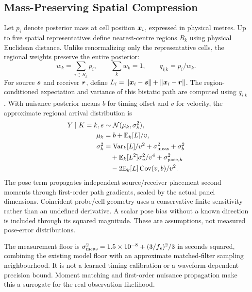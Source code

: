 \subsection{Mass-Preserving Spatial Compression}
Let $p_i$ denote posterior mass at cell position $\boldsymbol{x}_i$, expressed in
physical metres. Up to five spatial representatives define nearest-centre
regions $R_k$ using physical Euclidean distance. Unlike renormalizing only the
representative cells, the regional weights preserve the entire posterior:
\begin{equation}
 w_k=\sum_{i\in R_k}p_i,\qquad
 \sum_k w_k=1,\qquad q_{i|k}=p_i/w_k.
\end{equation}
For source $\boldsymbol{s}$ and receiver $\boldsymbol{r}$, define
$L_i=\|\boldsymbol{x}_i-\boldsymbol{s}\|+\|\boldsymbol{x}_i-\boldsymbol{r}\|$.
The region-conditioned expectation and variance of this bistatic path are
computed using $q_{i|k}$. With nuisance posterior means $b$ for timing offset and
$v$ for velocity, the approximate regional arrival distribution is
\begin{align}
Y\mid K=k,e &\sim \mathcal{N}(\mu_k,\sigma_k^2),\\
\mu_k &=b+\mathbb{E}_k[L]/v,\\
\sigma_k^2 &=\operatorname{Var}_k[L]/v^2+\sigma_{\rm meas}^2+\sigma_b^2\nonumber\\
 &\quad+\mathbb{E}_k[L^2]\sigma_v^2/v^4+\sigma_{{\rm pose},k}^2\nonumber\\
 &\quad-2\mathbb{E}_k[L]\operatorname{Cov}(v,b)/v^2.
\end{align}
The pose term propagates independent source/receiver placement second moments
through first-order path gradients, scaled by the actual panel dimensions.
Coincident probe/cell geometry uses a conservative finite sensitivity rather
than an undefined derivative. A scalar pose bias without a known direction is
included through its squared magnitude. These are assumptions, not measured
pose-error distributions.

The measurement floor is
$\sigma_{\rm meas}^2=1.5\times10^{-8}+(3/f_s)^2/3$ in seconds squared,
combining the existing model floor with an approximate matched-filter sampling
neighbourhood. It is not a learned timing calibration or a waveform-dependent
precision bound. Moment matching and first-order nuisance propagation make
this a surrogate for the real observation likelihood.

